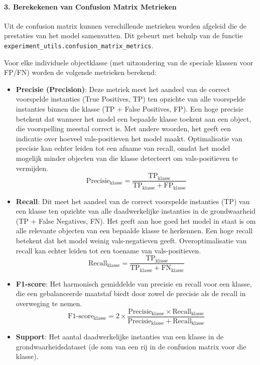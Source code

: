 \paragraph{3. Berekekenen van Confusion Matrix Metrieken}
Uit de confusion matrix kunnen verschillende metrieken worden afgeleid die de prestaties van het model samenvatten.
Dit gebeurt met behulp van de functie \texttt{experiment\_utils.confusion\_matrix\_metrics}. 

Voor elke individuele objectklasse (met uitzondering van de speciale klassen voor FP/FN) worden de volgende metrieken berekend:
\begin{itemize}
    \item \textbf{Precisie (Precision)}: Deze metriek meet het aandeel van de correct voorspel\-de instanties (True Positives, TP) 
        ten opzichte van alle voorspelde instanties binnen die klasse (TP + False Positives, FP). 
        Een hoge precisie betekent dat wanneer het model een bepaalde klasse toekent aan een object, die voorspelling meestal correct is. 
        Met andere woorden, het geeft een indicatie over hoeveel vals-positieven het model maakt. 
        Optimalisatie van precisie kan echter leiden tot een afname van recall,
        omdat het model mogelijk minder objecten van die klasse detecteert om vals-positieven te vermijden.
        \[
        \text{Precisie}_{\text{klasse}} = \frac{\text{TP}_{\text{klasse}}}{\text{TP}_{\text{klasse}} + \text{FP}_{\text{klasse}}}
        \]
    \item \textbf{Recall}: Dit meet het aandeel van de correct voorspelde instanties (TP) 
        van een klasse ten opzichte van alle daadwerkelijke instanties in de grondwaarheid (TP + False Negatives, FN). 
        Het geeft aan hoe goed het model in staat is om alle relevante objecten van een bepaalde klasse te herkennen.
        Een hoge recall betekent dat het model weinig vals-negatieven geeft.
        Overoptimalisatie van recall kan echter leiden tot een toename van vals-positieven.
        \[
        \text{Recall}_{\text{klasse}} = \frac{\text{TP}_{\text{klasse}}}{\text{TP}_{\text{klasse}} + \text{FN}_{\text{klasse}}}
        \]
    \item \textbf{F1-score}: Het harmonisch gemiddelde van precisie en recall voor een klasse, 
    die een gebalanceerde maatstaf biedt door zowel de precisie als de recall in overweging te nemen.
    \[
    \text{F1-score}_{\text{klasse}} = 2 \times \frac{\text{Precisie}_{\text{klasse}} \times \text{Recall}_{\text{klasse}}}{\text{Precisie}_{\text{klasse}} + \text{Recall}_{\text{klasse}}}
    \]
    \item \textbf{Support}: Het aantal daadwerkelijke instanties van een klasse in de grondwaarheidsdataset (de som van een rij in de confusion matrix voor die klasse).
\end{itemize}

